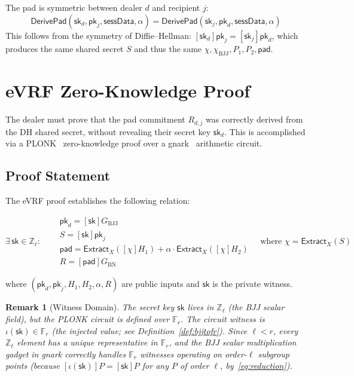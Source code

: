 \documentclass[11pt,a4paper]{article}
\newtheorem{remark}{Remark}[section]
\newcommand{\F}{\mathbb{F}}
\newcommand{\Z}{\mathbb{Z}}
\newcommand{\Fr}{\F_r}
\newcommand{\Fl}{\Z_\ell}
\newcommand{\genbjj}{G_{\mathrm{BJJ}}}
\newcommand{\genbn}{G_{\mathrm{BN}}}
\newcommand{\sk}{\mathsf{sk}}
\newcommand{\pk}{\mathsf{pk}}
\newcommand{\pad}{\mathsf{pad}}
\newcommand{\Extract}{\mathsf{Extract}_X}
\newcommand{\dhx}{\chi}
\begin{document}
The pad is symmetric between dealer $d$ and recipient $j$:
\begin{equation}
  \mathsf{DerivePad}(\sk_d, \pk_j, \mathsf{sessData}, \alpha)
  = \mathsf{DerivePad}(\sk_j, \pk_d, \mathsf{sessData}, \alpha)
  \label{eq:symmetry}
\end{equation}
This follows from the symmetry of Diffie--Hellman: $[\sk_d]\pk_j = [\sk_j]\pk_d$,
which produces the same shared secret $S$ and thus the same $\dhx, \dhx_{\mathrm{BJJ}}, P_1, P_2, \pad$.

\section{eVRF Zero-Knowledge Proof}
\label{sec:zkproof}

The dealer must prove that the pad commitment $R_{d,j}$ was correctly derived
from the DH shared secret, without revealing their secret key $\sk_d$. This is
accomplished via a PLONK~\cite{gabizon2019} zero-knowledge proof over a
gnark~\cite{gnark} arithmetic circuit.

\subsection{Proof Statement}
\label{sec:proofstatement}

The eVRF proof establishes the following relation:

\begin{equation}
  \boxed{
    \exists\, \sk \in \Fl : \quad
    \begin{aligned}
      &\pk_d = [\sk]\genbjj \\
      &S = [\sk]\pk_j \\
      &\pad = \Extract([\dhx]H_1) + \alpha \cdot \Extract([\dhx]H_2) \\
      &R = [\pad]\genbn
    \end{aligned}
  }
  \quad\text{where } \dhx = \Extract(S)
  \label{eq:proof-relation}
\end{equation}

where $(\pk_d, \pk_j, H_1, H_2, \alpha, R)$ are public inputs and $\sk$ is
the private witness.

\begin{remark}[Witness Domain]
  The secret key $\sk$ lives in $\Fl$ (the BJJ scalar field), but the PLONK
  circuit is defined over $\Fr$. The circuit witness is $\iota(\sk) \in \Fr$
  (the injected value; see Definition~\ref{def:bjjtofr}). Since $\ell < r$,
  every $\Fl$ element has a unique representative in $\Fr$, and the BJJ
  scalar multiplication gadget in gnark correctly handles $\Fr$ witnesses
  operating on order-$\ell$ subgroup points (because $[\iota(\sk)]P = [\sk]P$
  for any $P$ of order $\ell$, by~\eqref{eq:reduction}).
\end{remark}
\end{document}
